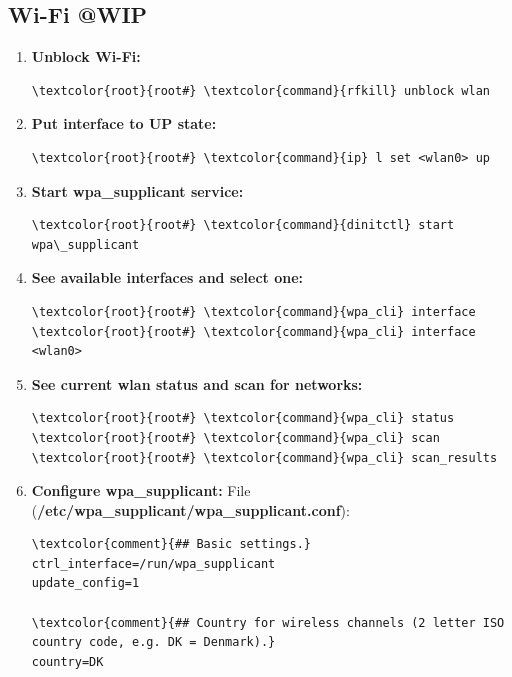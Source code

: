 \documentclass[10pt, a4paper, onecolumn, oneside, titlepage, openany]{book}
\begin{document}
\subsection{Wi-Fi @WIP}
\begin{enumerate}
    \item \textbf{Unblock Wi-Fi:}
\begin{Verbatim}[commandchars=\\\{\}]
\textcolor{root}{root#} \textcolor{command}{rfkill} unblock wlan
\end{Verbatim}
    \item \textbf{Put interface to UP state:}
\begin{Verbatim}[commandchars=\\\{\}]
\textcolor{root}{root#} \textcolor{command}{ip} l set <wlan0> up
\end{Verbatim}
    \item \textbf{Start wpa\_supplicant service:}
\begin{Verbatim}[commandchars=\\\{\}]
\textcolor{root}{root#} \textcolor{command}{dinitctl} start wpa\_supplicant
\end{Verbatim}
    \item \textbf{See available interfaces and select one:}
\begin{Verbatim}[commandchars=\\\{\}]
\textcolor{root}{root#} \textcolor{command}{wpa_cli} interface
\textcolor{root}{root#} \textcolor{command}{wpa_cli} interface <wlan0>
\end{Verbatim}
    \item \textbf{See current wlan status and scan for networks:}
\begin{Verbatim}[commandchars=\\\{\}]
\textcolor{root}{root#} \textcolor{command}{wpa_cli} status
\textcolor{root}{root#} \textcolor{command}{wpa_cli} scan
\textcolor{root}{root#} \textcolor{command}{wpa_cli} scan_results
\end{Verbatim}
    \item \textbf{Configure wpa\_supplicant:}
\newline File (\textbf{\textcolor{file}{/etc/wpa\_supplicant/wpa\_supplicant.conf}}):
\begin{Verbatim}[commandchars=\\\{\}]
\textcolor{comment}{## Basic settings.}
ctrl_interface=/run/wpa_supplicant
update_config=1

\textcolor{comment}{## Country for wireless channels (2 letter ISO country code, e.g. DK = Denmark).}
country=DK


\end{Verbatim}
\end{enumerate}
\end{document}
